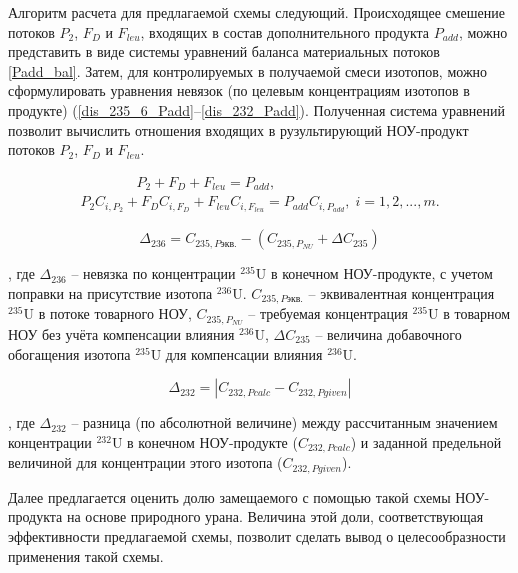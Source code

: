 {Алгоритм расчета для предлагаемой схемы следующий. Происходящее смешение потоков $P_2$, $F_D$ и $F_{leu}$, входящих в состав дополнительного продукта $P_{add}$, можно представить в виде системы уравнений баланса материальных потоков \ref{Padd_bal}. Затем, для контролируемых в получаемой смеси изотопов, можно сформулировать уравнения невязок (по целевым концентрациям изотопов в продукте) (\ref{dis_235_6_Padd}--\ref{dis_232_Padd}). Полученная система уравнений позволит вычислить отношения входящих в рузультирующий НОУ-продукт потоков $P_2$, $F_D$ и $F_{leu}$.

\begin{equation} \label{Padd_bal} 
  \begin{array}{l} {\quad \quad \quad \quad {P_{2}+F_D+F_{leu}=P_{add}},} \\ {P_{2}C_{i,P_{2}} + F_DC_{i,F_D} + F_{leu}C_{i,F_{leu}}  = P_{add}C_{i,P_{add}} ,\; i=1,2,...,m.} \end{array} 
\end{equation}


\begin{equation}
    \label{dis_235_6_Padd}
    \Delta_{236}=C_{235,P\textit{экв.}}-(C_{235,{P_{NU}}}+\Delta C_{235})
\end{equation}

, где $\Delta_{236}$ -- невязка по концентрации $^{235}$U в конечном НОУ-продукте, с учетом поправки на присутствие изотопа $^{236}$U. $C_{235,P\textit{экв.}}$ -- эквивалентная концентрация $^{235}$U в потоке товарного НОУ, $C_{235,{P_{NU}}}$ -- требуемая концентрация $^{235}$U в товарном НОУ без учёта компенсации влияния $^{236}$U, $\Delta C_{235}$ -- величина добавочного обогащения изотопа $^{235}$U для компенсации влияния $^{236}$U. 

\begin{equation}
\label{dis_232_Padd}
\Delta_{232}=\left|C_{232,P\textit{calc}}-C_{232,P\textit{given}}\right|
\end{equation}

, где $\Delta_{232}$ -- разница (по абсолютной величине) между рассчитанным значением концентрации $^{232}$U в конечном НОУ-продукте ($C_{232,P\textit{calc}}$) и заданной предельной величиной для концентрации этого изотопа ($C_{232,P\textit{given}}$).

Далее предлагается оценить долю замещаемого с помощью такой схемы НОУ-продукта на основе природного урана. Величина этой доли, соответствующая эффективности предлагаемой схемы, позволит сделать вывод о целесообразности применения такой схемы.  

}
